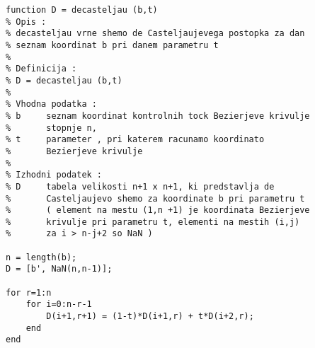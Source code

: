 \documentclass[12pt,a4paper,twoside]{article}
\theoremstyle{definition} %
\theoremstyle{plain} %
\numberwithin{equation}{section}  %
\begin{document}
\begin{lstlisting}[caption = {}]
function D = decasteljau (b,t) 
% Opis : 
% decasteljau vrne shemo de Casteljaujevega postopka za dan 
% seznam koordinat b pri danem parametru t 
%
% Definicija : 
% D = decasteljau (b,t) 
%
% Vhodna podatka : 
% b     seznam koordinat kontrolnih tock Bezierjeve krivulje
%       stopnje n,
% t     parameter , pri katerem racunamo koordinato
%       Bezierjeve krivulje
% 
% Izhodni podatek : 
% D     tabela velikosti n+1 x n+1, ki predstavlja de
%       Casteljaujevo shemo za koordinate b pri parametru t
%       ( element na mestu (1,n +1) je koordinata Bezierjeve
%       krivulje pri parametru t, elementi na mestih (i,j)
%       za i > n-j+2 so NaN )

n = length(b);
D = [b', NaN(n,n-1)];

for r=1:n
    for i=0:n-r-1
        D(i+1,r+1) = (1-t)*D(i+1,r) + t*D(i+2,r);
    end
end
\end{lstlisting}

\begin{lstlisting}[caption = {}]

\end{lstlisting}

\begin{lstlisting}[caption = {}]

\end{lstlisting}

\begin{lstlisting}[caption = {}]

\end{lstlisting}

\begin{lstlisting}[caption = {}]

\end{lstlisting}

\begin{lstlisting}[caption = {}]

\end{lstlisting}

\begin{lstlisting}[caption = {}]

\end{lstlisting}
\end{document}
